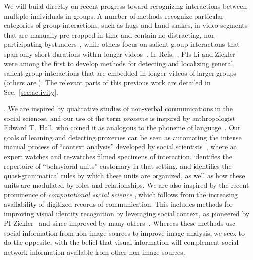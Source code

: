 We will build directly on recent progress toward recognizing interactions between multiple individuals in groups. A number of methods recognize particular categories of group-interactions, such as hugs and hand-shakes, in video segments that are manually pre-cropped in time and contain no distracting, non-participating bystanders~\cite{Intille:act,Patron-PerezMRZ12,PrabhakarR12}, while others focus on salient group-interactions that span only short durations within longer videos~\cite{Hongeng:act,Hakeem:act,Choi:recogtrack, Ryoo:group, Regh2013}. In Refs.~\cite{groupdet2013,LiIJCV2012,Li2010}, PIs Li and Zickler were among the first  to develop methods  for detecting and localizing general, salient group-interactions that are embedded in longer videos of larger groups (others are \cite{Cristani:fformation,Amer:group}). The  relevant parts of this previous work are detailed in Sec.~\ref{sec:activity}.


. We are inspired by qualitative studies of non-verbal communications in the social sciences, and our use of the term \emph{proxeme} is inspired by anthropologist Edward T.~Hall, who coined it as analogous to the phoneme of language~\cite{hall1974}. Our goals of learning and detecting proxemes can be seen as automating the intense manual process of ``context analysis'' developed by social scientists~\cite{Kendon1990}, where an expert watches and re-watches filmed specimens of interaction, identifies the repertoire of ``behavioral units'' customary in that setting, and identifies the quasi-grammatical rules by which these units are organized, as well as how these units are modulated by roles and relationships. We are also inspired by the recent prominence of \emph{computational social science} \cite{Lazer2009,Pantic}, which follows from the increasing availability of digitized records of communication. This includes methods for improving visual identity recognition by leveraging social context, as pioneered by PI Zickler~\cite{Stone2008,Stone2010} and since improved by many others~\cite{Dikmen:classify,Poppe2012,LeeBMVC2011,hanalbum2013album}.  Whereas these methods use social information from non-image sources to improve image analysis, we seek to do the opposite, with the belief that visual information will complement social network information available from other non-image sources. 

